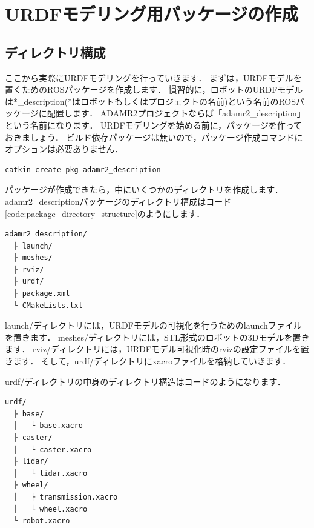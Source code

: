 \documentclass[{../../master}]{subfiles}
\begin{document}
\section{URDFモデリング用パッケージの作成}
\label{sec:create_urdf_package}

\subsection{ディレクトリ構成}

ここから実際にURDFモデリングを行っていきます．
まずは，URDFモデルを置くためのROSパッケージを作成します．
慣習的に，ロボットのURDFモデルは\textsf{*\_description}(*はロボットもしくはプロジェクトの名前)という名前のROSパッケージに配置します．
ADAMR2プロジェクトならば「\textsf{adamr2\_description}」という名前になります．
URDFモデリングを始める前に，パッケージを作っておきましょう．
ビルド依存パッケージは無いので，パッケージ作成コマンドにオプションは必要ありません．

\begin{lstlisting}[language=sh, caption=Create a Package to put the URDF Model in]
catkin create pkg adamr2_description
\end{lstlisting}

パッケージが作成できたら，中にいくつかのディレクトリを作成します．
\textsf{adamr2\_description}パッケージのディレクトリ構成はコード\ref{code:package_directory_structure}のようにします．

\begin{lstlisting}[language=sh, caption=Directory Structure of adamr2\_description, label=code:package_directory_structure]
adamr2_description/
  ├ launch/
  ├ meshes/
  ├ rviz/
  ├ urdf/
  ├ package.xml
  └ CMakeLists.txt
\end{lstlisting}

\textsf{launch/}ディレクトリには，URDFモデルの可視化を行うためのlaunchファイルを置きます．
\textsf{meshes/}ディレクトリには，STL形式のロボットの3Dモデルを置きます．
\textsf{rviz/}ディレクトリには，URDFモデル可視化時の\textsf{rviz}の設定ファイルを置きます．
そして，\textsf{urdf/}ディレクトリにxacroファイルを格納していきます．

\textsf{urdf/}ディレクトリの中身のディレクトリ構造はコードのようになります．

\begin{lstlisting}[language=sh, caption=Directory Structure of \textsf{urdf/}, label=code:urdf_directory_structure]
urdf/
  ├ base/
  │   └ base.xacro
  ├ caster/
  │   └ caster.xacro
  ├ lidar/
  │   └ lidar.xacro
  ├ wheel/
  │   ├ transmission.xacro
  │   └ wheel.xacro
  └ robot.xacro
\end{lstlisting}
\end{document}
